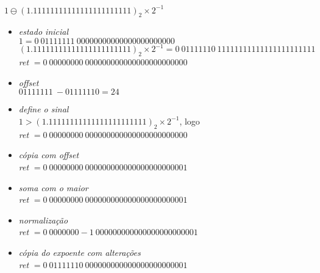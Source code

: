\documentclass{article}
\begin{document}
\item $1 \ominus {(1.11111111111111111111111)}_{2} \times 2^{-1}$
    \begin{itemize}
        
    \item \textit{estado inicial} \\    
    $1 = {0}\ {01111111}\ {00000000000000000000000}$ \\
    ${(1.11111111111111111111111)}_{2} \times 2^{-1} = {0}\ {01111110}\ {11111111111111111111111}$ \\
    \textit{ret} $= {0}\ {00000000}\ {000000000000000000000000}$

    \item \textit{offset} \\
    ${01111111}\ - {01111110} = 24$
    
    \item \textit{define o sinal} \\
    $1 > {(1.11111111111111111111111)}_{2} \times 2^{-1}$, logo \\ 
    \textit{ret} $= {0}\ {00000000}\ {000000000000000000000000}$ \\
      
    \item \textit{cópia com offset} \\
    \textit{ret} $= {0}\ {00000000}\ {000000000000000000000001}$ \\
      
    \item \textit{soma com o maior} \\
    \textit{ret} $= {0}\ {00000000}\ {000000000000000000000001}$ \\

    \item \textit{normalização} \\
    \textit{ret} $= {0}\ {0000000-1}\ {000000000000000000000001}$ \\
    
    \item \textit{cópia do expoente com alterações} \\
    \textit{ret} $= {0}\ {01111110}\ {000000000000000000000001}$ \\
    \end{itemize}
\end{document}

